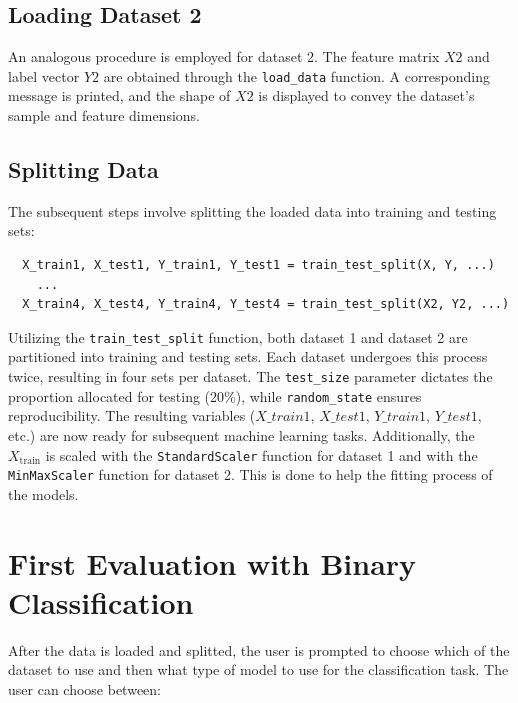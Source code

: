 \documentclass{article}
\begin{document}
\begin{titlepage}
  \subsection{Loading Dataset 2}
  An analogous procedure is employed for dataset 2. The feature matrix \(X2\) and label vector \(Y2\) are obtained through the \texttt{load\_data} function. A corresponding message is printed, and the shape of \(X2\) is displayed to convey the dataset's sample and feature dimensions.

  \subsection{Splitting Data}
  The subsequent steps involve splitting the loaded data into training and testing sets:

  \begin{verbatim}
  X_train1, X_test1, Y_train1, Y_test1 = train_test_split(X, Y, ...)
    ...
  X_train4, X_test4, Y_train4, Y_test4 = train_test_split(X2, Y2, ...)
  \end{verbatim}

  Utilizing the \texttt{train\_test\_split} function, both dataset 1 and dataset 2 are partitioned into training and testing sets. Each dataset undergoes this process twice, resulting in four sets per dataset.
  The \texttt{test\_size} parameter dictates the proportion allocated for testing (20\%), while \texttt{random\_state} ensures reproducibility.
  \newline
  \newline
  The resulting variables (\(X\_train1\), \(X\_test1\), \(Y\_train1\), \(Y\_test1\), etc.) are now ready for subsequent machine learning tasks.
  \newline
  \newline
  Additionally, the \(X_{\text{train}}\) is scaled with the \texttt{StandardScaler} function for dataset 1 and with the \texttt{MinMaxScaler} function for dataset 2. This is done to help the fitting process of the models.

  \section*{First Evaluation with Binary Classification}
  After the data is loaded and splitted, the user is prompted to choose which of the dataset to use and then what type of model to use for the classification task. The user can choose between:

\end{titlepage}
\end{document}
